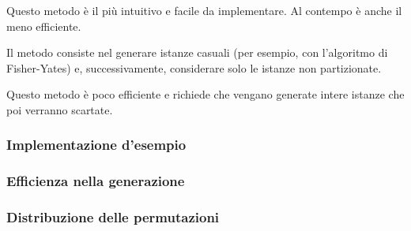 \documentclass[../../main.tex]{subfiles}
\begin{document}
Questo metodo è il più intuitivo e facile da implementare.
Al contempo è anche il meno efficiente.

Il metodo consiste nel generare istanze casuali (per esempio, con l'algoritmo di Fisher-Yates) e, successivamente, considerare solo le istanze non partizionate.

Questo metodo è poco efficiente e richiede che vengano generate intere istanze che poi verranno scartate.

\subsubsection{Implementazione d'esempio}


\subsubsection{Efficienza nella generazione}

\subsubsection{Distribuzione delle permutazioni}
\end{document}

